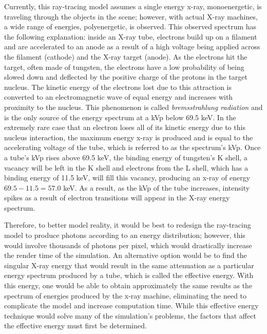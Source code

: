 Currently, this ray-tracing model assumes a single energy x-ray, monoenergetic, is traveling through the objects in the scene; however, with actual X-ray machines, a wide range of energies, polyenergetic, is observed. This observed spectrum has the following explanation: inside an X-ray tube, electrons build up on a filament and are accelerated to an anode as a result of a high voltage being applied across the filament (cathode) and the X-ray target (anode). As the electrons hit the target, often made of tungsten, the electrons have a low probability of being slowed down and deflected by the positive charge of the protons in the target nucleus. The kinetic energy of the electrons lost due to this attraction is converted to an electromagnetic wave of equal energy and increases with proximity to the nucleus.  This phenomenon is called \textit{bremsstrahlung radiation} and is the only source of the energy spectrum at a kVp below 69.5 keV.  In the extremely rare case that an electron loses all of its kinetic energy due to this nucleus interaction, the maximum energy x-ray is produced and is equal to the accelerating voltage of the tube, which is referred to as the spectrum's kVp. Once a tube's kVp rises above 69.5 keV, the binding energy of tungsten's K shell, a vacancy will be left in the K shell and electrons from the L shell, which has a binding energy of 11.5 keV, will fill this vacancy, producing an x-ray of energy $69.5 - 11.5 = 57.0$ keV. As a result, as the kVp of the tube increases, intensity spikes as a result of electron transitions will appear in the X-ray energy spectrum. \cite{Seibert}

Therefore, to better model reality, it would be best to redesign the ray-tracing model to produce photons according to an energy distribution; however, this would involve thousands of photons per pixel, which would drastically increase the render time of the simulation. An alternative option would be to find the singular X-ray energy that would result in the same attenuation as a particular energy spectrum produced by a tube, which is called the effective energy. \cite{Seibert} With this energy, one would be able to obtain approximately the same results as the spectrum of energies produced by the x-ray machine, eliminating the need to complicate the model and increase computation time. While this effective energy technique would solve many of the simulation's problems, the factors that affect the effective energy must first be determined.



